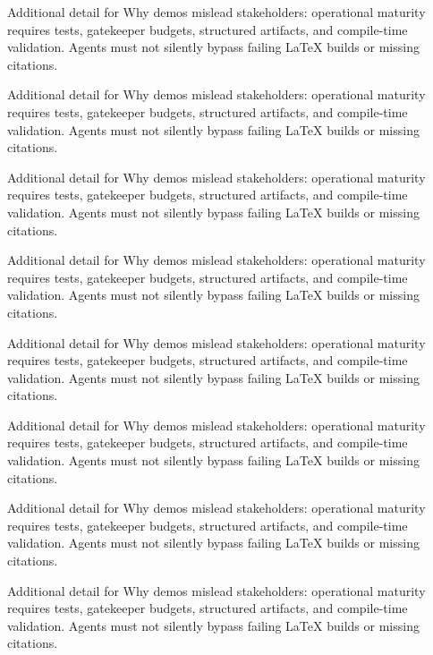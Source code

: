 Additional detail for Why demos mislead stakeholders: operational maturity requires tests, gatekeeper budgets, structured artifacts, and compile-time validation. Agents must not silently bypass failing LaTeX builds or missing citations. \cite{crewai2024} \cite{langgraph2024} \cite{mcp2024}

Additional detail for Why demos mislead stakeholders: operational maturity requires tests, gatekeeper budgets, structured artifacts, and compile-time validation. Agents must not silently bypass failing LaTeX builds or missing citations. \cite{crewai2024} \cite{langgraph2024} \cite{mcp2024}

Additional detail for Why demos mislead stakeholders: operational maturity requires tests, gatekeeper budgets, structured artifacts, and compile-time validation. Agents must not silently bypass failing LaTeX builds or missing citations. \cite{crewai2024} \cite{langgraph2024} \cite{mcp2024}

Additional detail for Why demos mislead stakeholders: operational maturity requires tests, gatekeeper budgets, structured artifacts, and compile-time validation. Agents must not silently bypass failing LaTeX builds or missing citations. \cite{crewai2024} \cite{langgraph2024} \cite{mcp2024}

Additional detail for Why demos mislead stakeholders: operational maturity requires tests, gatekeeper budgets, structured artifacts, and compile-time validation. Agents must not silently bypass failing LaTeX builds or missing citations. \cite{crewai2024} \cite{langgraph2024} \cite{mcp2024}

Additional detail for Why demos mislead stakeholders: operational maturity requires tests, gatekeeper budgets, structured artifacts, and compile-time validation. Agents must not silently bypass failing LaTeX builds or missing citations. \cite{crewai2024} \cite{langgraph2024} \cite{mcp2024}

Additional detail for Why demos mislead stakeholders: operational maturity requires tests, gatekeeper budgets, structured artifacts, and compile-time validation. Agents must not silently bypass failing LaTeX builds or missing citations. \cite{crewai2024} \cite{langgraph2024} \cite{mcp2024}

Additional detail for Why demos mislead stakeholders: operational maturity requires tests, gatekeeper budgets, structured artifacts, and compile-time validation. Agents must not silently bypass failing LaTeX builds or missing citations. \cite{crewai2024} \cite{langgraph2024} \cite{mcp2024}

